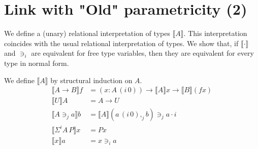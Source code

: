 \documentclass[english]{PaperTools/latex/lipics}
\newcommand\CP[3]{(#2,_{#1} #3)}
\newcommand\param[1]{\!\cdot\!#1}
\newcommand\op[1]{∋_{#1}}
\newcommand\ip[3]{Σ^{#1} {#2}\,{#3}}
\newcommand\mor[2]{{#1}\,{#2}}
\newcommand\proj[2]{\mor{#2}{(#1\,0)}}
\begin{document}
\section{Link with "Old" parametricity (2)}
We define a (unary) relational interpretation of types $⟦A⟧$. This
interpretation coincides with the usual relational interpretation of types.
We show that, if $⟦·⟧$ and $∋_i$ are equivalent for free type variables,
then they are equivalent for every type in normal form.

\begin{definition}
We define $⟦A⟧$ by structural induction on $A$.
  \begin{align*}
    ⟦A → B⟧ f & = (x:\proj i A) → ⟦A⟧ x → ⟦B⟧ (f x)\\
    ⟦U⟧ A & = A → U\\
    ⟦A \op j a ⟧ b &= ⟦A⟧ \CP j {\proj i a} b \op j a \param i \\
    ⟦\ip i A P⟧ x & = P x\\
    ⟦x⟧ a & = x \op i a
  \end{align*}
\end{definition}

\providecommand\TO{\overrightarrow}
\providecommand\FROM{\overleftarrow}
\end{document}
